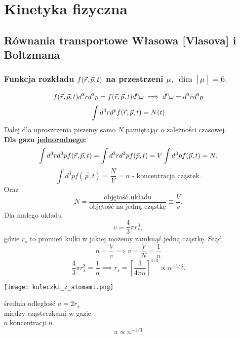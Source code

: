 \section{Kinetyka fizyczna}
\subsection{Równania transportowe Własowa [Vlasova] i Boltzmana}
\subsubsection{Funkcja rozkładu $f(\vec{r},\vec{p},t)$ na przestrzeni $\mu,\ \dim[\mu]=6.$}
\begin{equation} f(\vec{r},\vec{p},t) d^3rd^3p = f(\vec{r},\vec{p},t) d^6\omega \implies d^6\omega 
= d^3rd^3p \end{equation}
\begin{equation} \int d^3rd^pf(\vec{r},\vec{p},t) = N(t) \end{equation}
Dalej dla uproszczenia piszemy samo $N$ pamiętając o zależności czasowej.\\

\textbf{Dla gazu \underline{jednorodnego}:}
$$ \int d^3rd^3p f(\vec{r},\vec{p},t) = \int d^3rd^3pf(\vec{p},t) = V \int d^3p f(\vec{p},t)=N.$$
\begin{equation}
\int d^3p f(\vec{p},t) = \frac{N}{V} = n \mbox{ - koncentracja cząstek.}
\end{equation}
Oraz
\begin{equation}
N = \frac{\mbox{objętość układu}}{\mbox{objętość na jedną cząstkę}} \equiv 
\frac{V}{v}.
\end{equation}
Dla małego układu 
\begin{equation}
v=\frac{4}{3} \pi r_s^3 ,
\end{equation}
gdzie $r_s$ to promień kulki w jakiej możemy zamknąć jedną cząstkę. Stąd
$$ n = \frac{V}{v} \implies v=\frac{V}{N} = \frac{1}{n}$$
$$ \frac{4}{3} \pi r_s^3 = \frac{1}{n} \implies r_s = \left[ \frac{3}{4\pi n}
\right]^{1/3} \propto n^{-1/3}.$$
\begin{center}
\begin{minipage}{0.3\textwidth}
\texttt{[image: kuleczki\_z\_atomami.png]}
\end{minipage}
\begin{minipage}{0.4\textwidth}
średnia odległość $a=2r_s$ \\
między cząsteczkami w gazie \\
o koncentracji $n$ \\
$$a \propto n^{-1/3}$$ \vspace{-5mm}\\
\end{minipage}
\end{center}

